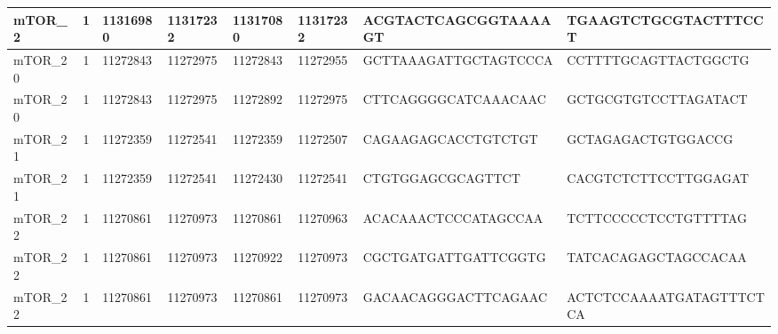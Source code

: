 \begin{landscape}
\begin{longtable}{| p{} | p{} | p{} | p{} | p{} | p{} | p{} | p{} |}
\multicolumn{1}{|l|}{mTOR\_2}    & \multicolumn{1}{c|}{1}  & \multicolumn{1}{l|}{11316980}  & \multicolumn{1}{l|}{11317232}  & \multicolumn{1}{l|}{11317080}  & \multicolumn{1}{l|}{11317232}  & \multicolumn{1}{l|}{ACGTACTCAGCGGTAAAAGT}            & \multicolumn{1}{l|}{TGAAGTCTGCGTACTTTCCT}          \\ \hline
\multicolumn{1}{|l|}{mTOR\_20}   & \multicolumn{1}{c|}{1}  & \multicolumn{1}{l|}{11272843}  & \multicolumn{1}{l|}{11272975}  & \multicolumn{1}{l|}{11272843}  & \multicolumn{1}{l|}{11272955}  & \multicolumn{1}{l|}{GCTTAAAGATTGCTAGTCCCA}           & \multicolumn{1}{l|}{CCTTTTGCAGTTACTGGCTG}          \\ \hline
\multicolumn{1}{|l|}{mTOR\_20}   & \multicolumn{1}{c|}{1}  & \multicolumn{1}{l|}{11272843}  & \multicolumn{1}{l|}{11272975}  & \multicolumn{1}{l|}{11272892}  & \multicolumn{1}{l|}{11272975}  & \multicolumn{1}{l|}{CTTCAGGGGCATCAAACAAC}            & \multicolumn{1}{l|}{GCTGCGTGTCCTTAGATACT}          \\ \hline
\multicolumn{1}{|l|}{mTOR\_21}   & \multicolumn{1}{c|}{1}  & \multicolumn{1}{l|}{11272359}  & \multicolumn{1}{l|}{11272541}  & \multicolumn{1}{l|}{11272359}  & \multicolumn{1}{l|}{11272507}  & \multicolumn{1}{l|}{CAGAAGAGCACCTGTCTGT}             & \multicolumn{1}{l|}{GCTAGAGACTGTGGACCG}            \\ \hline
\multicolumn{1}{|l|}{mTOR\_21}   & \multicolumn{1}{c|}{1}  & \multicolumn{1}{l|}{11272359}  & \multicolumn{1}{l|}{11272541}  & \multicolumn{1}{l|}{11272430}  & \multicolumn{1}{l|}{11272541}  & \multicolumn{1}{l|}{CTGTGGAGCGCAGTTCT}               & \multicolumn{1}{l|}{CACGTCTCTTCCTTGGAGAT}          \\ \hline
\multicolumn{1}{|l|}{mTOR\_22}   & \multicolumn{1}{c|}{1}  & \multicolumn{1}{l|}{11270861}  & \multicolumn{1}{l|}{11270973}  & \multicolumn{1}{l|}{11270861}  & \multicolumn{1}{l|}{11270963}  & \multicolumn{1}{l|}{ACACAAACTCCCATAGCCAA}            & \multicolumn{1}{l|}{TCTTCCCCCTCCTGTTTTAG}          \\ \hline
\multicolumn{1}{|l|}{mTOR\_22}   & \multicolumn{1}{c|}{1}  & \multicolumn{1}{l|}{11270861}  & \multicolumn{1}{l|}{11270973}  & \multicolumn{1}{l|}{11270922}  & \multicolumn{1}{l|}{11270973}  & \multicolumn{1}{l|}{CGCTGATGATTGATTCGGTG}            & \multicolumn{1}{l|}{TATCACAGAGCTAGCCACAA}          \\ \hline
\multicolumn{1}{|l|}{mTOR\_22}   & \multicolumn{1}{c|}{1}  & \multicolumn{1}{l|}{11270861}  & \multicolumn{1}{l|}{11270973}  & \multicolumn{1}{l|}{11270861}  & \multicolumn{1}{l|}{11270973}  & \multicolumn{1}{l|}{GACAACAGGGACTTCAGAAC}            & \multicolumn{1}{l|}{ACTCTCCAAAATGATAGTTTCTCA}      \\ \hline

\end{longtable}
\end{landscape}

